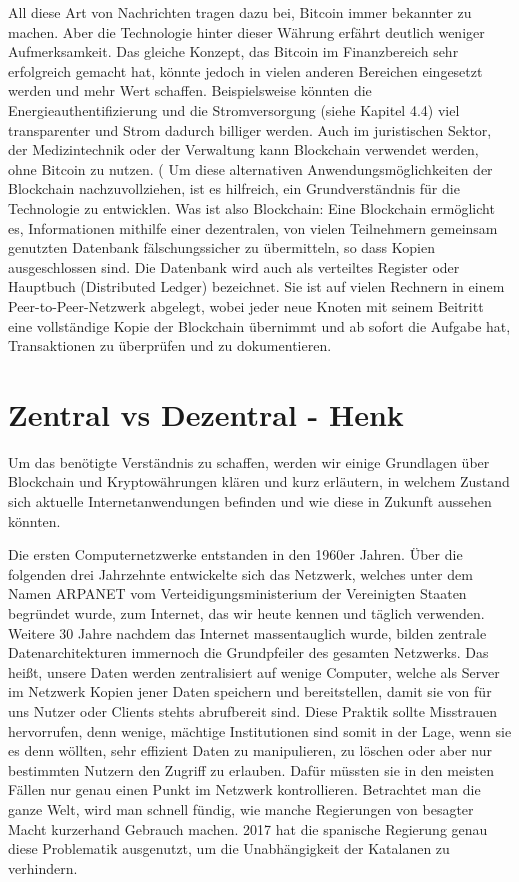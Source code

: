 All diese Art von Nachrichten tragen dazu bei, Bitcoin immer bekannter zu machen. Aber die Technologie hinter dieser Währung erfährt deutlich weniger Aufmerksamkeit. Das gleiche Konzept, das Bitcoin im Finanzbereich sehr erfolgreich gemacht hat, könnte jedoch in vielen anderen Bereichen eingesetzt werden und mehr Wert schaffen. Beispielsweise könnten die Energieauthentifizierung und die Stromversorgung (siehe Kapitel 4.4) viel transparenter und Strom dadurch billiger werden.  Auch im juristischen Sektor, der Medizintechnik oder der Verwaltung kann Blockchain verwendet werden, ohne Bitcoin zu nutzen.
(%
Um diese alternativen Anwendungsmöglichkeiten der Blockchain nachzuvollziehen, ist es hilfreich, ein Grundverständnis für die Technologie zu entwicklen. Was ist also Blockchain: Eine Blockchain \cite{CW21} ermöglicht es, Informationen mithilfe einer dezentralen, von vielen Teilnehmern gemeinsam genutzten Datenbank fälschungssicher zu übermitteln, so dass Kopien ausgeschlossen sind. Die Datenbank wird auch als verteiltes Register oder Hauptbuch (Distributed Ledger) bezeichnet. Sie ist auf vielen Rechnern in einem Peer-to-Peer-Netzwerk abgelegt, wobei jeder neue Knoten mit seinem Beitritt eine vollständige Kopie der Blockchain übernimmt und ab sofort die Aufgabe hat, Transaktionen zu überprüfen und zu dokumentieren.
\section{Zentral vs Dezentral - Henk}
Um das benötigte Verständnis zu schaffen, werden wir einige Grundlagen über Blockchain und Kryptowährungen klären und kurz erläutern, in welchem Zustand sich aktuelle Internetanwendungen befinden und wie diese in Zukunft aussehen könnten. \newline

Die ersten Computernetzwerke entstanden in den 1960er Jahren. Über die folgenden drei Jahrzehnte entwickelte sich das Netzwerk, welches unter dem Namen ARPANET vom Verteidigungsministerium der Vereinigten Staaten begründet wurde, zum Internet, das wir heute kennen und täglich verwenden\cite{arpanet}. Weitere 30 Jahre nachdem das Internet massentauglich wurde, bilden zentrale Datenarchitekturen immernoch die Grundpfeiler des gesamten Netzwerks. Das heißt, unsere Daten werden zentralisiert auf wenige Computer, welche als Server im Netzwerk Kopien jener Daten speichern und bereitstellen, damit sie von für uns Nutzer oder Clients stehts abrufbereit sind. Diese Praktik sollte Misstrauen hervorrufen, denn wenige, mächtige Institutionen sind somit in der Lage, wenn sie es denn wöllten, sehr effizient Daten zu manipulieren, zu löschen oder aber nur bestimmten Nutzern den Zugriff zu erlauben. Dafür müssten sie in den meisten Fällen nur genau einen Punkt im Netzwerk kontrollieren.\cite{censorship} Betrachtet man die ganze Welt, wird man schnell fündig, wie manche Regierungen von besagter Macht kurzerhand Gebrauch machen. 2017 hat die spanische Regierung genau diese Problematik ausgenutzt, um die Unabhängigkeit der Katalanen zu verhindern\cite{catalonia}.
\clearpage

